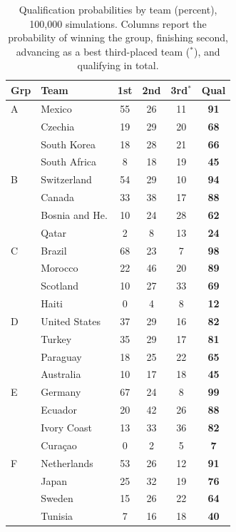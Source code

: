 \documentclass[11pt,letterpaper]{article}
\begin{document}
\begin{table}[ht]
\centering\scriptsize
\caption{Qualification probabilities by team (percent), 100{,}000 simulations. Columns report the probability of winning the group, finishing second, advancing as a best third-placed team ($^{*}$), and qualifying in total.}
\label{tab:qual}
\begin{minipage}{0.49\textwidth}\centering
\begin{tabular}{llcccc}
\toprule
Grp & Team & 1st & 2nd & 3rd$^{*}$ & Qual \\
\midrule
A & Mexico & 55 & 26 & 11 & \textbf{91} \\
 & Czechia & 19 & 29 & 20 & \textbf{68} \\
 & South Korea & 18 & 28 & 21 & \textbf{66} \\
 & South Africa & 8 & 18 & 19 & \textbf{45} \\
\addlinespace
B & Switzerland & 54 & 29 & 10 & \textbf{94} \\
 & Canada & 33 & 38 & 17 & \textbf{88} \\
 & Bosnia and He. & 10 & 24 & 28 & \textbf{62} \\
 & Qatar & 2 & 8 & 13 & \textbf{24} \\
\addlinespace
C & Brazil & 68 & 23 & 7 & \textbf{98} \\
 & Morocco & 22 & 46 & 20 & \textbf{89} \\
 & Scotland & 10 & 27 & 33 & \textbf{69} \\
 & Haiti & 0 & 4 & 8 & \textbf{12} \\
\addlinespace
D & United States & 37 & 29 & 16 & \textbf{82} \\
 & Turkey & 35 & 29 & 17 & \textbf{81} \\
 & Paraguay & 18 & 25 & 22 & \textbf{65} \\
 & Australia & 10 & 17 & 18 & \textbf{45} \\
\addlinespace
E & Germany & 67 & 24 & 8 & \textbf{99} \\
 & Ecuador & 20 & 42 & 26 & \textbf{88} \\
 & Ivory Coast & 13 & 33 & 36 & \textbf{82} \\
 & Curaçao & 0 & 2 & 5 & \textbf{7} \\
\addlinespace
F & Netherlands & 53 & 26 & 12 & \textbf{91} \\
 & Japan & 25 & 32 & 19 & \textbf{76} \\
 & Sweden & 15 & 26 & 22 & \textbf{64} \\
 & Tunisia & 7 & 16 & 18 & \textbf{40} \\

\end{tabular}
\end{minipage}
\end{table}
\end{document}
